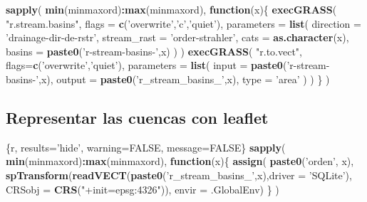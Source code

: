 \documentclass[11pt,]{article}
\newenvironment{Shaded}{\begin{snugshade}}{\end{snugshade}}
\newcommand{\KeywordTok}[1]{\textcolor[rgb]{0.13,0.29,0.53}{\textbf{#1}}}
\newcommand{\DataTypeTok}[1]{\textcolor[rgb]{0.13,0.29,0.53}{#1}}
\newcommand{\StringTok}[1]{\textcolor[rgb]{0.31,0.60,0.02}{#1}}
\newcommand{\OtherTok}[1]{\textcolor[rgb]{0.56,0.35,0.01}{#1}}
\newcommand{\ControlFlowTok}[1]{\textcolor[rgb]{0.13,0.29,0.53}{\textbf{#1}}}
\newcommand{\OperatorTok}[1]{\textcolor[rgb]{0.81,0.36,0.00}{\textbf{#1}}}
\newcommand{\NormalTok}[1]{#1}
\begin{document}
\begin{Shaded}
\begin{Highlighting}[]
\KeywordTok{sapply}\NormalTok{(}
  \KeywordTok{min}\NormalTok{(minmaxord)}\OperatorTok{:}\KeywordTok{max}\NormalTok{(minmaxord),}
  \ControlFlowTok{function}\NormalTok{(x)\{}
    \KeywordTok{execGRASS}\NormalTok{(}
      \StringTok{"r.stream.basins"}\NormalTok{,}
      \DataTypeTok{flags =} \KeywordTok{c}\NormalTok{(}\StringTok{'overwrite'}\NormalTok{,}\StringTok{'c'}\NormalTok{,}\StringTok{'quiet'}\NormalTok{),}
      \DataTypeTok{parameters =} \KeywordTok{list}\NormalTok{(}
        \DataTypeTok{direction =} \StringTok{'drainage-dir-de-rstr'}\NormalTok{,}
        \DataTypeTok{stream_rast =} \StringTok{'order-strahler'}\NormalTok{,}
        \DataTypeTok{cats =} \KeywordTok{as.character}\NormalTok{(x),}
        \DataTypeTok{basins =} \KeywordTok{paste0}\NormalTok{(}\StringTok{'r-stream-basins-'}\NormalTok{,x)}
\NormalTok{      )}
\NormalTok{    )}
    \KeywordTok{execGRASS}\NormalTok{(}
      \StringTok{"r.to.vect"}\NormalTok{,}
      \DataTypeTok{flags=}\KeywordTok{c}\NormalTok{(}\StringTok{'overwrite'}\NormalTok{,}\StringTok{'quiet'}\NormalTok{),}
      \DataTypeTok{parameters =} \KeywordTok{list}\NormalTok{(}
         \DataTypeTok{input =} \KeywordTok{paste0}\NormalTok{(}\StringTok{'r-stream-basins-'}\NormalTok{,x),}
         \DataTypeTok{output =} \KeywordTok{paste0}\NormalTok{(}\StringTok{'r_stream_basins_'}\NormalTok{,x),}
         \DataTypeTok{type =} \StringTok{'area'}
\NormalTok{      )}
\NormalTok{    )}
\NormalTok{  \}}
\NormalTok{)}
\end{Highlighting}
\end{Shaded}

\subsection{Representar las cuencas con
leaflet}\label{representar-las-cuencas-con-leaflet}

\begin{Shaded}
\begin{Highlighting}[]
\NormalTok{\{r, results=}\StringTok{'hide'}\NormalTok{, warning=}\OtherTok{FALSE}\NormalTok{, message=}\OtherTok{FALSE}\NormalTok{\}}
\KeywordTok{sapply}\NormalTok{(}
  \KeywordTok{min}\NormalTok{(minmaxord)}\OperatorTok{:}\KeywordTok{max}\NormalTok{(minmaxord),}
  \ControlFlowTok{function}\NormalTok{(x)\{}
    \KeywordTok{assign}\NormalTok{(}
      \KeywordTok{paste0}\NormalTok{(}\StringTok{'orden'}\NormalTok{, x),}
      \KeywordTok{spTransform}\NormalTok{(}\KeywordTok{readVECT}\NormalTok{(}\KeywordTok{paste0}\NormalTok{(}\StringTok{'r_stream_basins_'}\NormalTok{,x),}\DataTypeTok{driver =} \StringTok{'SQLite'}\NormalTok{), }\DataTypeTok{CRSobj =} \KeywordTok{CRS}\NormalTok{(}\StringTok{"+init=epsg:4326"}\NormalTok{)),}
      \DataTypeTok{envir =}\NormalTok{ .GlobalEnv)}
\NormalTok{  \}}
\NormalTok{)}
\end{Highlighting}
\end{Shaded}
\end{document}
